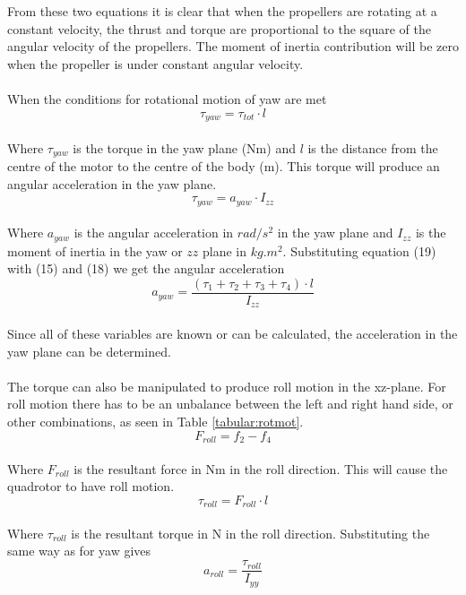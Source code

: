 From these two equations it is clear that when the propellers are rotating at a constant velocity, the thrust and torque are proportional to the square of the angular velocity of the propellers. The moment of inertia contribution will be zero when the propeller is under constant angular velocity. 
\\\\
When the conditions for rotational motion of yaw are met
\begin{equation}
\tau_{yaw} = \tau_{tot}\cdot l
\end{equation}
\\
Where $\tau_{yaw}$ is the torque in the yaw plane (Nm) and $l$ is the distance from the centre of the motor to the centre of the body (m). This torque will produce an angular acceleration in the yaw plane. 
\begin{equation}
\tau_{yaw} = a_{yaw}\cdot I_{zz}
\end{equation}
\\
Where $a_{yaw}$ is the angular acceleration in $rad/s^2$ in the yaw plane and $I_{zz}$ is the moment of inertia in the yaw or $zz$ plane in $kg.m^2$. Substituting equation (19) with (15) and (18) we get the angular acceleration
\begin{equation}
a_{yaw} = \frac{(\tau_1 + \tau_2 + \tau_3 + \tau_4) \cdot l}{I_{zz}}
\end{equation}
\\ 
Since all of these variables are known or can be calculated, the acceleration in the yaw plane can be determined. 
\\\\
The torque can also be manipulated to produce roll motion in the xz-plane. For roll motion there has to be an unbalance between the left and right hand side, or other combinations, as seen in Table \ref{tabular:rotmot}. 
\begin{equation}
F_{roll} = f_2 - f_4
\end{equation}
\\
Where $F_{roll}$ is the resultant force in Nm in the roll direction. This will cause the quadrotor to have roll motion. 
\begin{equation}
\tau_{roll} = F_{roll}\cdot l
\end{equation}
\\
Where $\tau_{roll}$ is the resultant torque in N in the roll direction. Substituting the same way as for yaw gives
\begin{equation}
a_{roll} = \frac{\tau_{roll}}{I_{yy}}
\end{equation}
